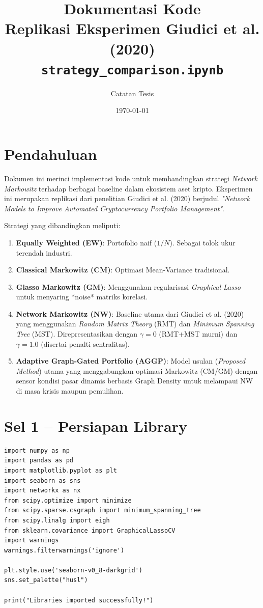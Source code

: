 \documentclass[12pt,a4paper]{article}
\title{\textbf{Dokumentasi Kode} \\ \large Replikasi Eksperimen Giudici et al. (2020) \\
\small \texttt{strategy\_comparison.ipynb}}
\author{Catatan Tesis}
\date{\today}
\begin{document}
\maketitle
\tableofcontents
\newpage

\section{Pendahuluan}
Dokumen ini merinci implementasi kode untuk membandingkan strategi \textit{Network Markowitz} terhadap berbagai baseline dalam ekosistem aset kripto. Eksperimen ini merupakan replikasi dari penelitian Giudici et al. (2020) berjudul \textit{"Network Models to Improve Automated Cryptocurrency Portfolio Management"}.

Strategi yang dibandingkan meliputi:
\begin{enumerate}
    \item \textbf{Equally Weighted (EW)}: Portofolio naif ($1/N$). Sebagai tolok ukur terendah industri.
    \item \textbf{Classical Markowitz (CM)}: Optimasi Mean-Variance tradisional.
    \item \textbf{Glasso Markowitz (GM)}: Menggunakan regularisasi \textit{Graphical Lasso} untuk menyaring *noise* matriks korelasi.
    \item \textbf{Network Markowitz (NW)}: Baseline utama dari Giudici et al. (2020) yang menggunakan \textit{Random Matrix Theory} (RMT) dan \textit{Minimum Spanning Tree} (MST). Direpresentasikan dengan $\gamma=0$ (RMT+MST murni) dan $\gamma=1.0$ (disertai penalti sentralitas).
    \item \textbf{Adaptive Graph-Gated Portfolio (AGGP)}: Model usulan (\textit{Proposed Method}) utama yang menggabungkan optimasi Markowitz (CM/GM) dengan sensor kondisi pasar dinamis berbasis Graph Density untuk melampaui NW di masa krisis maupun pemulihan.
\end{enumerate}

\section{Sel 1 -- Persiapan Library}
\begin{lstlisting}[caption={Import libraries dan konfigurasi visualisasi}]
import numpy as np
import pandas as pd
import matplotlib.pyplot as plt
import seaborn as sns
import networkx as nx
from scipy.optimize import minimize
from scipy.sparse.csgraph import minimum_spanning_tree
from scipy.linalg import eigh
from sklearn.covariance import GraphicalLassoCV
import warnings
warnings.filterwarnings('ignore')

plt.style.use('seaborn-v0_8-darkgrid')
sns.set_palette("husl")

print("Libraries imported successfully!")
\end{lstlisting}
\end{document}
